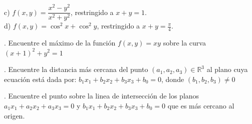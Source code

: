\documentclass[letterpaper]{article}
\renewcommand{\*}{\cdot}
\theoremstyle{definition}
\begin{document}
c) $f(x,y) = \dfrac{x^2 - y^2}{x^2 + y^2}$, restringido a $x + y =1$.\\

d) $f(x,y) = \cos^2{x} +\cos^2{y}$, restringido a $x + y =\frac{\pi}{4}$.


. Encuentre el máximo de la función $f(x,y) = xy$ sobre la curva $(x +1)^2 + y^2 =1$

. Encuentre la distancia más cercana del punto $(a_1, a_2, a_3) \in \mathbb{R}^3$ al plano cuya ecuación está dada por: $b_1x_1 + b_2x_2 + b_3x_3 + b_0 = 0$, donde $(b_1, b_2, b_3) \neq 0 $

. Encuentre el punto sobre la linea de intersección de los planos  $a_1x_1 + a_2x_2 + a_3x_3 = 0$ y $b_1x_1 + b_2x_2 + b_3x_3 + b_0 = 0$ que es más cercano al origen.
\end{document}
